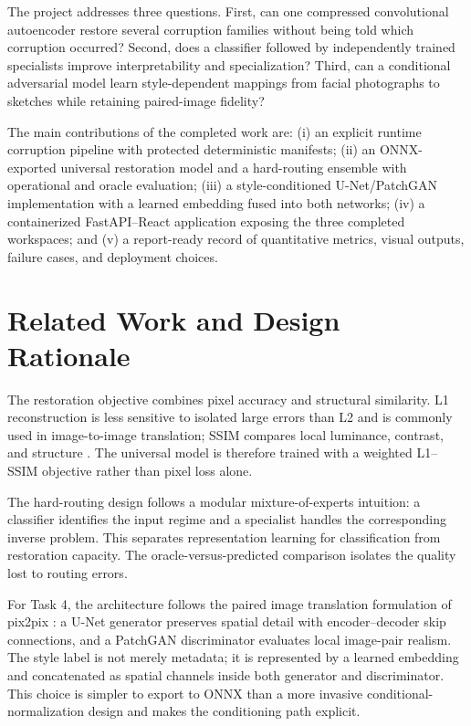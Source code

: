 \documentclass[conference]{IEEEtran}
\begin{document}
The project addresses three questions. First, can one compressed convolutional autoencoder restore several corruption families without being told which corruption occurred? Second, does a classifier followed by independently trained specialists improve interpretability and specialization? Third, can a conditional adversarial model learn style-dependent mappings from facial photographs to sketches while retaining paired-image fidelity?

The main contributions of the completed work are: (i) an explicit runtime corruption pipeline with protected deterministic manifests; (ii) an ONNX-exported universal restoration model and a hard-routing ensemble with operational and oracle evaluation; (iii) a style-conditioned U-Net/PatchGAN implementation with a learned embedding fused into both networks; (iv) a containerized FastAPI--React application exposing the three completed workspaces; and (v) a report-ready record of quantitative metrics, visual outputs, failure cases, and deployment choices.

\section{Related Work and Design Rationale}
The restoration objective combines pixel accuracy and structural similarity. L1 reconstruction is less sensitive to isolated large errors than L2 and is commonly used in image-to-image translation; SSIM compares local luminance, contrast, and structure \cite{wang2004ssim}. The universal model is therefore trained with a weighted L1--SSIM objective rather than pixel loss alone.

The hard-routing design follows a modular mixture-of-experts intuition: a classifier identifies the input regime and a specialist handles the corresponding inverse problem. This separates representation learning for classification from restoration capacity. The oracle-versus-predicted comparison isolates the quality lost to routing errors.

For Task 4, the architecture follows the paired image translation formulation of pix2pix \cite{isola2017pix2pix}: a U-Net generator preserves spatial detail with encoder--decoder skip connections, and a PatchGAN discriminator evaluates local image-pair realism. The style label is not merely metadata; it is represented by a learned embedding and concatenated as spatial channels inside both generator and discriminator. This choice is simpler to export to ONNX than a more invasive conditional-normalization design and makes the conditioning path explicit.
\end{document}
